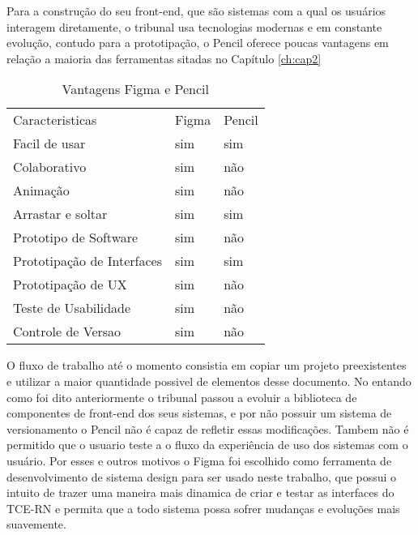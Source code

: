   Para a construção do seu front-end, que são sistemas com a qual os usuários interagem diretamente, o tribunal usa tecnologias modernas e em constante evolução, contudo para a prototipação, o Pencil oferece poucas vantagens em relação a maioria das ferramentas sitadas no Capítulo \ref{ch:cap2}

  \begin{table*}[!ht]
    \centering
    \caption{Vantagens Figma e Pencil}
    \begin{tabular}{lll}
      \rowcolor[HTML]{AAAAAA}
      Caracteristicas             &
      Figma                       &
      Pencil                      \\
      \rowcolor[HTML]{DDDDDD}
      Facil de usar               &
      sim                         &
      sim                         \\
      Colaborativo                &
      sim                         &
      não                         \\
      \rowcolor[HTML]{DDDDDD}
      Animação                    &
      sim                         &
      não                         \\
      Arrastar e soltar           &
      sim                         &
      sim                         \\
      \rowcolor[HTML]{DDDDDD}
      Prototipo de Software       &
      sim                         &
      não                         \\
      Prototipação de Interfaces  &
      sim                         &
      sim                         \\
      \rowcolor[HTML]{DDDDDD}
      Prototipação de UX          &
      sim                         &
      não                         \\
      Teste de Usabilidade        &
      sim                         &
      não                         \\
      \rowcolor[HTML]{DDDDDD}
      Controle de Versao          &
      sim                         &
      não                         \\
    \end{tabular}
    \label{table-figma_vs_pencil}
  \end{table*}

  O fluxo de trabalho até o momento consistia em copiar um projeto preexistentes e utilizar a maior quantidade possivel de elementos desse documento. No entando como foi dito anteriormente o tribunal passou a evoluir a biblioteca de componentes de front-end dos seus sistemas, e por não possuir um sistema de versionamento o Pencil não é capaz de refletir essas modificações. Tambem não é permitido que o usuario teste a o fluxo da experiência de uso dos sistemas com o usuário. Por esses e outros motivos o Figma foi escolhido como ferramenta de desenvolvimento de sistema design para ser usado neste trabalho, que possui o intuito de trazer uma maneira mais dinamica de criar e testar as interfaces do TCE-RN e permita que a todo sistema possa sofrer mudanças e evoluções mais suavemente.

